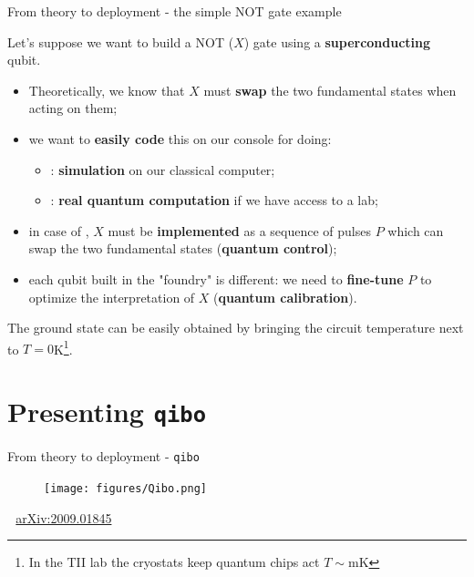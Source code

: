\documentclass[8pt, xcolor={svgnames}, hyperref={colorlinks,linkcolor=black, citecolor=amethyst, urlcolor=amethyst}]{beamer}
\begin{document}
\begin{frame}{From theory to deployment - the simple NOT gate example}

\large

Let's suppose we want to build a NOT ($X$) gate using a \textbf{superconducting}
qubit. 
\vspace{0.3cm}
\pause 
\begin{itemize}
    \item[\faPencilSquareO] Theoretically, we know that $X$ must \textbf{swap} 
    the two fundamental states when acting on them;
    \pause
    \item[\faTerminal] we want to \textbf{easily code} this on our console for doing:
    \begin{itemize}
        \item[\faCode]: \textbf{simulation} on our classical computer;
        \item[\faCog]: \textbf{real quantum computation} if we have access to a lab; 
    \end{itemize}
    \pause
    \item[\faWrench] in case of \faCog, $X$ must be \textbf{implemented} 
    as a sequence of pulses $P$ which can swap the two fundamental states 
    (\textbf{quantum control});
    \pause
    \item[\faSliders] each qubit built in the "foundry" is different: 
    we need to \textbf{fine-tune} $P$ to optimize the interpretation of $X$ 
    (\textbf{quantum calibration}).
\end{itemize}

\pause
\vspace{0.2cm}
\begin{tcolorbox}[colback=amethyst!30, title=Some more info]
  The ground state can be easily obtained by bringing the circuit
  temperature next to $T=0$K\footnote{In the TII lab the cryostats keep quantum chips act
  $T\sim$mK}.
\end{tcolorbox}
\end{frame}

\section{Presenting \texttt{qibo}}

\begin{frame}{From theory to deployment - \texttt{qibo}}
\large
    \begin{figure}
    \centering 
    \texttt{[image: figures/Qibo.png]}
  \end{figure}
  \faBook\,\, \href{https://arxiv.org/abs/2009.01845}{arXiv:2009.01845}
\end{frame}
\end{document}
